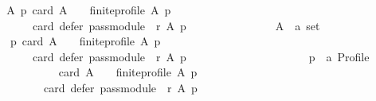\begin{isabellebody}
%
\isadelimproof
%
\endisadelimproof
%
\isatagproof
{}\isamarkupfalse%
\ {\isacharminus}{\kern0pt}\isanewline
\ \ \isamarkupfalse%
\ {\isachardoublequoteopen}{\isasymforall}A\ p{\isachardot}{\kern0pt}\ {\isacharparenleft}{\kern0pt}card\ A\ {\isasymge}\ {}\ {\isasymand}\ finite{\isacharunderscore}{\kern0pt}profile\ A\ p{\isacharparenright}{\kern0pt}\ {\isasymlongrightarrow}\isanewline
\ \ \ \ \ \ \ \ \ \ card\ {\isacharparenleft}{\kern0pt}defer\ {\isacharparenleft}{\kern0pt}pass{\isacharunderscore}{\kern0pt}module\ {}\ r{\isacharparenright}{\kern0pt}\ A\ p{\isacharparenright}{\kern0pt}\ {\isacharequal}{\kern0pt}\ {}{\isachardoublequoteclose}\isanewline
\ \ \isamarkupfalse%
\isanewline
\ \ \ \ \isamarkupfalse%
\isanewline
\ \ \ \ \ \ A\ {\isacharcolon}{\kern0pt}{\isacharcolon}{\kern0pt}\ {\isachardoublequoteopen}{\isacharprime}{\kern0pt}a\ set{\isachardoublequoteclose}\isanewline
\ \ \ \ \isamarkupfalse%
\isanewline
\ \ \ \ \ \ {\isachardoublequoteopen}{\isasymforall}p{\isachardot}{\kern0pt}\ {\isacharparenleft}{\kern0pt}card\ A\ {\isasymge}\ {}\ {\isasymand}\ finite{\isacharunderscore}{\kern0pt}profile\ A\ p{\isacharparenright}{\kern0pt}\ {\isasymlongrightarrow}\isanewline
\ \ \ \ \ \ \ \ \ \ card\ {\isacharparenleft}{\kern0pt}defer\ {\isacharparenleft}{\kern0pt}pass{\isacharunderscore}{\kern0pt}module\ {}\ r{\isacharparenright}{\kern0pt}\ A\ p{\isacharparenright}{\kern0pt}\ {\isacharequal}{\kern0pt}\ {}{\isachardoublequoteclose}\isanewline
\ \ \ \ \isamarkupfalse%
\isanewline
\ \ \ \ \ \ \isamarkupfalse%
\isanewline
\ \ \ \ \ \ \ \ p\ {\isacharcolon}{\kern0pt}{\isacharcolon}{\kern0pt}\ {\isachardoublequoteopen}{\isacharprime}{\kern0pt}a\ Profile{\isachardoublequoteclose}\isanewline
\ \ \ \ \ \ \isamarkupfalse%
\isanewline
\ \ \ \ \ \ \ \ {\isachardoublequoteopen}{\isacharparenleft}{\kern0pt}card\ A\ {\isasymge}\ {}\ {\isasymand}\ finite{\isacharunderscore}{\kern0pt}profile\ A\ p{\isacharparenright}{\kern0pt}\ {\isasymlongrightarrow}\isanewline
\ \ \ \ \ \ \ \ \ \ \ \ card\ {\isacharparenleft}{\kern0pt}defer\ {\isacharparenleft}{\kern0pt}pass{\isacharunderscore}{\kern0pt}module\ {}\ r{\isacharparenright}{\kern0pt}\ A\ p{\isacharparenright}{\kern0pt}\ {\isacharequal}{\kern0pt}\ {}{\isachardoublequoteclose}\isanewline
\ \ \ \ \ \ \isamarkupfalse%
\isanewline
\ \ \ \ \ \ \ \ \isamarkupfalse%

\end{isabellebody}
